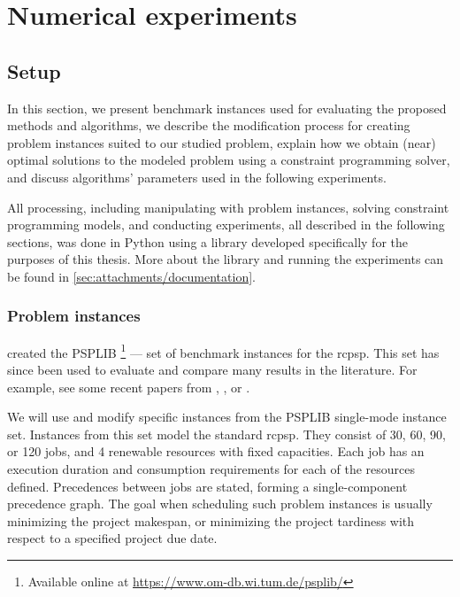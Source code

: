 \chapter{Numerical experiments} \label{chap:numerical-experiments}

\section{Setup} \label{sec:numerical-experiments/setup}

In this section, we present benchmark instances used for evaluating the proposed methods and algorithms,
we describe the modification process for creating problem instances suited to our studied problem,
explain how we obtain (near) optimal solutions to the modeled problem using a constraint programming solver,
and discuss algorithms' parameters used in the following experiments.

All processing, including manipulating with problem instances, solving constraint programming models,
and conducting experiments, all described in the following sections, was done in Python using a library
developed specifically for the purposes of this thesis.
More about the library and running the experiments can be found in \cref{sec:attachments/documentation}.

\subsection{Problem instances} \label{subsec:numerical-experiments/setup/instances}

\citet{Kolisch1997} created the PSPLIB%
\footnote{Available online at \url{https://www.om-db.wi.tum.de/psplib/}}
--- set of benchmark instances for the \ac{rcpsp}.
This set has since been used to evaluate and compare many results in the literature.
For example, see some recent papers from \citet{Bianco2011}, \citet{Cheng2015}, or \citet{Elsayed2017}.

We will use and modify specific instances from the PSPLIB single-mode instance set.
Instances from this set model the standard \ac{rcpsp}.
They consist of 30, 60, 90, or 120 jobs,
and 4 renewable resources with fixed capacities.
Each job has an execution duration and consumption requirements for each of the resources defined.
Precedences between jobs are stated, forming a single-component precedence graph.
The goal when scheduling such problem instances is usually minimizing the project makespan,
or minimizing the project tardiness with respect to a specified project due date.

